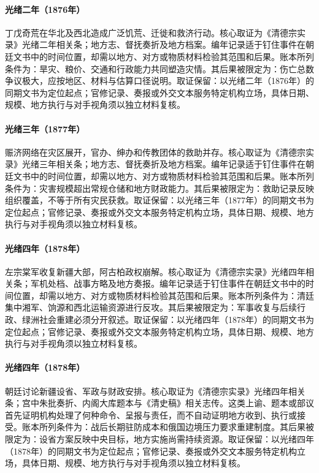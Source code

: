 \hypertarget{ledger:EQ-1876-NORTH-CHINA-FAMINE}{}\paragraph{光绪二年（1876年）}丁戊奇荒在华北及西北造成广泛饥荒、迁徙和救济行动。核心取证为《清德宗实录》光绪二年相关条；地方志、督抚奏折及地方档案。编年记录适于钉住事件在朝廷文书中的时间位置，却需以地方、对方或物质材料检验其范围和后果。账本所列条件为：旱灾、粮价、交通和行政能力共同塑造灾情。其后果被限定为：伤亡总数争议极大，应按地区、材料与估算口径说明。取证保留：以光绪二年（1876年）的同期文书为定位起点；官修记录、奏报或外交文本服务特定机构立场，具体日期、规模、地方执行与对手视角须以独立材料复核。
\hypertarget{ledger:EQ-1877-FAMINE-RELIEF-NETWORKS}{}\paragraph{光绪三年（1877年）}赈济网络在灾区展开，官办、绅办和传教团体的救助并存。核心取证为《清德宗实录》光绪三年相关条；地方志、督抚奏折及地方档案。编年记录适于钉住事件在朝廷文书中的时间位置，却需以地方、对方或物质材料检验其范围和后果。账本所列条件为：灾害规模超出常规仓储和地方财政能力。其后果被限定为：救助记录反映组织覆盖，不等于所有灾民获救。取证保留：以光绪三年（1877年）的同期文书为定位起点；官修记录、奏报或外交文本服务特定机构立场，具体日期、规模、地方执行与对手视角须以独立材料复核。
\hypertarget{ledger:EQ-1878-Zuo-ZONGTANG-XINJIANG}{}\paragraph{光绪四年（1878年）}左宗棠军收复新疆大部，阿古柏政权崩解。核心取证为《清德宗实录》光绪四年相关条；军机处档、战事方略及地方奏报。编年记录适于钉住事件在朝廷文书中的时间位置，却需以地方、对方或物质材料检验其范围和后果。账本所列条件为：清廷集中湘军、饷源和西北运输资源进行反攻。其后果被限定为：军事收复与后续行政、绿洲社会重建必须分开叙述。取证保留：以光绪四年（1878年）的同期文书为定位起点；官修记录、奏报或外交文本服务特定机构立场，具体日期、规模、地方执行与对手视角须以独立材料复核。
\hypertarget{ledger:EQ-1878-XINJIANG-PROVINCE-DEBATE}{}\paragraph{光绪四年（1878年）}朝廷讨论新疆设省、军政与财政安排。核心取证为《清德宗实录》光绪四年相关条；宫中朱批奏折、内阁大库题本与《清史稿》相关志传。这类上谕、题本或部议首先证明机构处理了何种命令、呈报与责任，而不自动证明地方收到、执行或接受。账本所列条件为：战后长期驻防成本和俄国边境压力要求重建制度。其后果被限定为：设省方案反映中央目标，地方实施尚需持续资源。取证保留：以光绪四年（1878年）的同期文书为定位起点；官修记录、奏报或外交文本服务特定机构立场，具体日期、规模、地方执行与对手视角须以独立材料复核。
